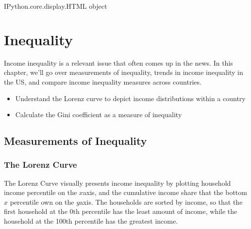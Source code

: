 \documentclass[letterpaper,10pt,english]{jupyterBook}
\begin{document}
\begin{sphinxVerbatim}[commandchars=\\\{\}]
\PYGZlt{}IPython.core.display.HTML object\PYGZgt{}
\end{sphinxVerbatim}


\section{Inequality}
\label{\detokenize{content/06-inequality/index:inequality}}\label{\detokenize{content/06-inequality/index::doc}}
\sphinxAtStartPar
Income inequality is a relevant issue that often comes up in the news. In this chapter, we’ll go over measurements of inequality, trends in income inequality in the US, and compare income inequality measures across countries.

\sphinxAtStartPar
{}
\begin{itemize}
\item {} 
\sphinxAtStartPar
Understand the Lorenz curve to depict income distributions within a country

\item {} 
\sphinxAtStartPar
Calculate the Gini coefficient as a measure of inequality

\end{itemize}


\subsection{Measurements of Inequality}
\label{\detokenize{content/06-inequality/inequality:measurements-of-inequality}}\label{\detokenize{content/06-inequality/inequality::doc}}

\subsubsection{The Lorenz Curve}
\label{\detokenize{content/06-inequality/inequality:the-lorenz-curve}}
\sphinxAtStartPar
The Lorenz Curve visually presents income inequality by plotting household income percentile on the \(x\)\sphinxhyphen{}axis, and the cumulative income share that the bottom \(x\) percentile own on the \(y\)\sphinxhyphen{}axis. The households are sorted by income, so that the first household at the 0th percentile has the least amount of income, while the household at the 100th percentile has the greatest income.
\end{document}
